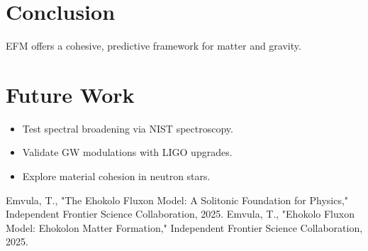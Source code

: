 \documentclass{article}
\begin{document}
\section{Conclusion}
EFM offers a cohesive, predictive framework for matter and gravity.

\section{Future Work}
\begin{itemize}
    \item Test spectral broadening via NIST spectroscopy.
    \item Validate GW modulations with LIGO upgrades.
    \item Explore material cohesion in neutron stars.
\end{itemize}

\begin{thebibliography}{2}
 Emvula, T., "The Ehokolo Fluxon Model: A Solitonic Foundation for Physics," Independent Frontier Science Collaboration, 2025.
 Emvula, T., "Ehokolo Fluxon Model: Ehokolon Matter Formation," Independent Frontier Science Collaboration, 2025.
\end{thebibliography}
\end{document}
